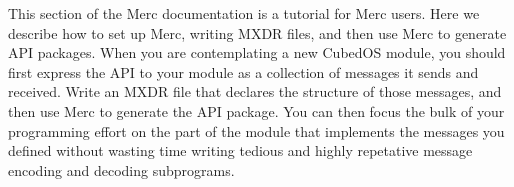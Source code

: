 This section of the Merc documentation is a tutorial for Merc users. Here we describe how to set
up Merc, writing MXDR files, and then use Merc to generate API packages. When you are
contemplating a new CubedOS module, you should first express the API to your module as a
collection of messages it sends and received. Write an MXDR file that declares the structure of
those messages, and then use Merc to generate the API package. You can then focus the bulk of
your programming effort on the part of the module that implements the messages you defined
without wasting time writing tedious and highly repetative message encoding and decoding
subprograms.

